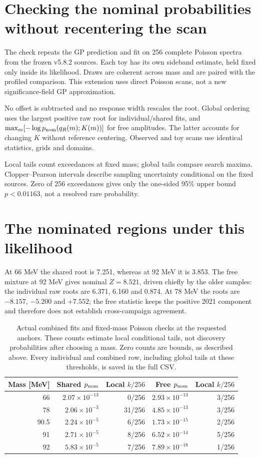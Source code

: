 \section*{Checking the nominal probabilities without recentering the scan}
The check repeats the GP prediction and fit on 256 complete Poisson spectra
from the frozen v5.8.2 sources. Each toy has its own sideband estimate, held
fixed only inside its likelihood. Draws are coherent across mass and are
paired with the profiled comparison. This extension uses direct Poisson scans,
not a new significance-field GP approximation.

No offset is subtracted and no response width rescales the root. Global
ordering uses the largest positive raw root for individual/shared fits, and
$\max_m[-\log p_{\rm nom}(q_R(m);K(m))]$ for free amplitudes. The latter accounts
for changing $K$ without reference centering. Observed and toy scans use
identical statistics, grids and domains.

Local tails count exceedances at fixed mass; global tails compare search
maxima. Clopper--Pearson intervals describe sampling uncertainty conditional
on the fixed sources. Zero of 256 exceedances gives only the one-sided 95\%
upper bound $p<0.01163$, not a resolved rare probability.

\section*{The nominated regions under this likelihood}
At 66 MeV the shared root is 7.251, whereas at 92 MeV it is 3.853. The free
mixture at 92 MeV gives nominal $Z=8.521$, driven chiefly by the older samples:
the individual raw roots are 6.371, 6.160 and 0.874. At 78 MeV the roots are
$-8.157$, $-5.200$ and $+7.552$; the free statistic keeps the positive 2021
component and therefore does not establish cross-campaign agreement.

\begin{table}[htbp]\centering\small
\begin{tabular}{rrrrr}\toprule
Mass [MeV] & Shared $p_{\rm nom}$ & Local $k/256$ & Free $p_{\rm nom}$ & Local $k/256$\\\midrule
66 & $2.07\times10^{-13}$ & 0/256 & $2.93\times10^{-13}$ & 3/256\\
78 & $2.06\times10^{-3}$ & 31/256 & $4.85\times10^{-13}$ & 3/256\\
90.5 & $2.24\times10^{-5}$ & 6/256 & $1.73\times10^{-15}$ & 2/256\\
91 & $2.71\times10^{-5}$ & 8/256 & $6.52\times10^{-14}$ & 5/256\\
92 & $5.83\times10^{-5}$ & 7/256 & $7.89\times10^{-18}$ & 1/256\\
\bottomrule\end{tabular}
\caption{Actual combined fits and fixed-mass Poisson checks at the requested
anchors. These counts estimate local conditional tails, not discovery
probabilities after choosing a mass. Zero counts are bounds, as described
above. Every individual and combined row, including global tails at these
thresholds, is saved in the full CSV.}
\label{tab:c0-anchors}
\end{table}

